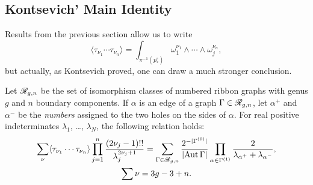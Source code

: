\subsection{Kontsevich' Main Identity}
\label{sec:KMI}

Results from the previous section allow us to write
\begin{equation}
  \label{eq:kontsevich-6}
  \langle \tau_{\nu_1} \cdots \tau_{\nu_n} \rangle = \int_{\pi^{-1}(p^\circ_*)} \omega_1^{\nu_1} \land \cdots
  \land \omega_j^{\nu_n},
\end{equation}
but actually, as Kontsevich proved, one can draw a much stronger
conclusion. 

\begin{theorem}
  Let $\RG[g,n]$ be the set of isomorphism classes of numbered
  ribbon graphs with genus $g$ and $n$ boundary components. If
  $\alpha$ is an edge of a graph $\Gamma \in \RG[g,n]$, let $\alpha^+$
  and $\alpha^-$ be the \emph{numbers} assigned to the two holes on
  the sides of $\alpha$. For real positive indeterminates $\lambda_1$,
  \ldots, $\lambda_N$, the following relation holds:
  \begin{multline*}
    \sum_\nu \langle \tau_{\nu_1} \cdots \tau_{\nu_n} \rangle \prod_{j=1}^n \frac {(2\nu_j - 1)!!}
    {\lambda_j^{2\nu_j + 1}} = \sum_{\Gamma \in \RG[g,n]} \frac
    {2^{-\card{\Vertices{\Gamma}}}} {\card{\Aut \Gamma}} \prod_{\alpha \in \Edges{\Gamma}}
    \frac {2} {\lambda_{\alpha^+} + \lambda_{\alpha^-}}, 
    \\ \sum \nu = 3g - 3 + n.
  \end{multline*}
\end{theorem}
